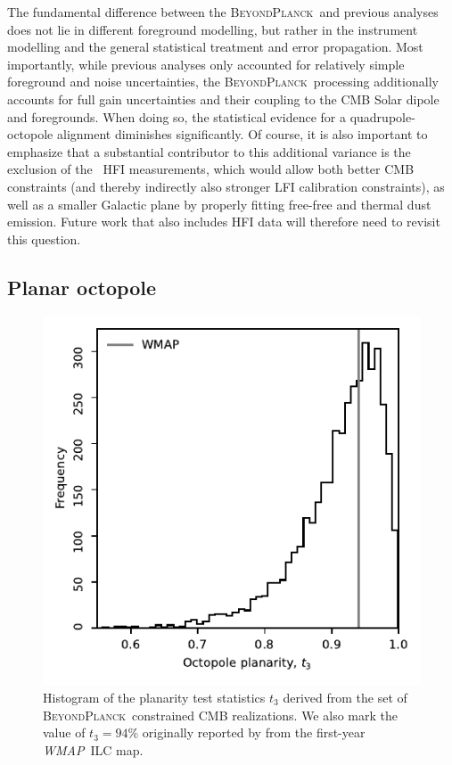 \documentclass[twocolumn]{aa}
\def\WMAP{\textit{WMAP}}
\newcommand{\BP}{\textsc{BeyondPlanck}}
\begin{document}
The fundamental difference between the \BP\ and previous analyses does
not lie in different foreground modelling, but rather in the
instrument modelling and the general statistical treatment and error
propagation. Most importantly, while previous analyses only accounted
for relatively simple foreground and noise uncertainties, the
\BP\ processing additionally accounts for full gain uncertainties and
their coupling to the CMB Solar dipole and foregrounds. When doing so,
the statistical evidence for a quadrupole-octopole alignment
diminishes significantly. Of course, it is also important to emphasize
that a substantial contributor to this additional variance is the
exclusion of the \Planck\ HFI measurements, which would allow both
better CMB constraints (and thereby indirectly also stronger LFI
calibration constraints), as well as a smaller Galactic plane by
properly fitting free-free and thermal dust emission. Future work that
also includes HFI data will therefore need to revisit this question.

\subsection{Planar octopole}
\label{sec:planar}

\begin{figure}
  \includegraphics[width=\linewidth]{figs/t_3.pdf}
  \caption{Histogram of the planarity test statistics $t_3$ derived
    from the set of \BP\ constrained CMB realizations. We also mark
    the value of $t_3=94\%$ originally reported by \citet{dOC2004}
    from the first-year \WMAP\ ILC map.}
  \label{fig:t_3}
\end{figure}
\end{document}
